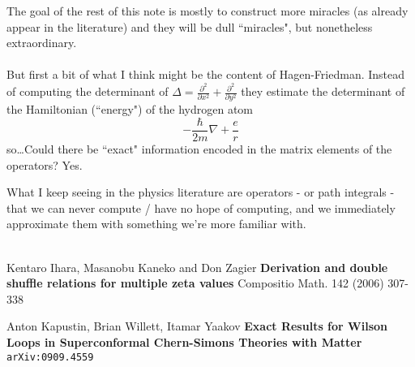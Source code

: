 \documentclass[12pt]{article}
\begin{document}
The goal of the rest of this note is mostly to construct more miracles (as already appear in the literature) and they will be dull ``miracles", but nonetheless extraordinary.  \\ \\
But first a bit of what I think might be the content of Hagen-Friedman.  Instead of computing the determinant of $\Delta = \frac{\partial^2}{\partial x^2}+\frac{\partial^2}{\partial y^2} $ they estimate the determinant of the Hamiltonian (``energy") of the hydrogen atom
$$ - \frac{\hbar}{2m}\nabla  + \frac{e}{r} $$
so\dots Could there be ``exact" information encoded in the matrix elements of the operators? Yes.

\newpage

\noindent What I keep seeing in the physics literature are operators - or path integrals - that we can never compute / have no hope of computing, and we immediately approximate them with something we're more familiar with. \\ \\


\vfill

\begin{thebibliography}{}

\item Kentaro Ihara, Masanobu Kaneko and Don Zagier \textbf{Derivation and double shuffle relations for multiple zeta values} Compositio Math. 142 (2006) 307-338

\item Anton Kapustin, Brian Willett, Itamar Yaakov \textbf{Exact Results for Wilson Loops in Superconformal Chern-Simons Theories with Matter} \texttt{arXiv:0909.4559}

\end{thebibliography}

\newpage

\selectfont \fontsize{15}{20}\selectfont
\end{document}

